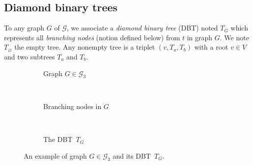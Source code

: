 \documentclass[preprint]{elsarticle}
\newcommand{\set}[1]{\left\{ #1 \right\}}
\newcommand{\card}[1]{\left| #1 \right|}
\newcommand{\mcalg}{\mathcal{G}}
\newcommand{\mts}{MS}
\newcommand{\ebt}{DBT}
\begin{document}
%

\subsection{Diamond binary trees} \label{subsec:dbt}

To any graph $G$ of $\mcalg$, we associate a \textit{diamond binary tree} (\ebt ) noted $T_G$ which represents all \textit{branching nodes} (notion defined below) from $t$ in graph $G$. We note $T_\varnothing$ the empty tree. Any nonempty tree is a triplet $(v, T_a, T_b)$ with a root $v \in V$ and two subtrees $T_a$ and $T_b$.

\begin{figure}[h]
\centering
\begin{subfigure}[b]{0.33\columnwidth}
\centering
\scalebox{.42}{}
\caption{Graph $G \in \mcalg_3$}
\label{subfig:ebt_1}
\end{subfigure}
~
\begin{subfigure}[b]{0.33\columnwidth}
\centering
\scalebox{.42}{}
\caption{Branching nodes in $G$}
\label{subfig:ebt_2}
\end{subfigure}
~
\begin{subfigure}[b]{0.28\columnwidth}
\centering
\scalebox{.58}{}
\caption{The \ebt ~$T_G$}
\label{subfig:ebt_3}
\end{subfigure}
\caption{An example of graph $G \in \mcalg_3$ and its \ebt ~$T_G$.}
\label{fig:ebt}
\end{figure}
\end{document}
